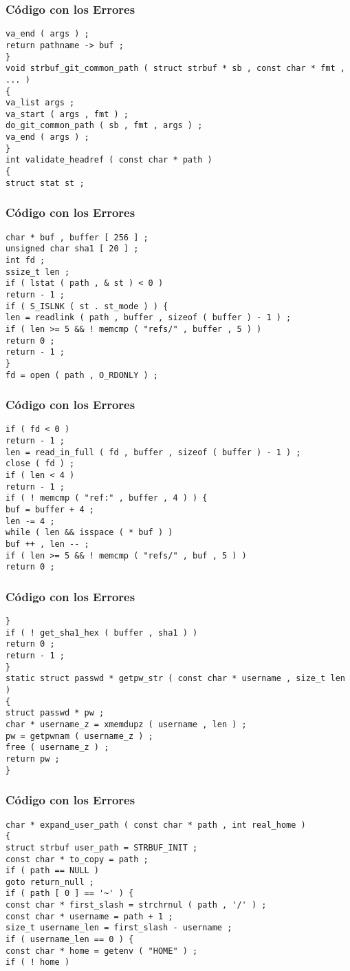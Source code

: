 \documentclass{beamer}
\begin{document}
\begin{frame}[fragile]
\frametitle{C\'odigo con los Errores}
\begin{verbatim}
va_end ( args ) ; 
return pathname -> buf ; 
} 
void strbuf_git_common_path ( struct strbuf * sb , const char * fmt , ... ) 
{ 
va_list args ; 
va_start ( args , fmt ) ; 
do_git_common_path ( sb , fmt , args ) ; 
va_end ( args ) ; 
} 
int validate_headref ( const char * path ) 
{ 
struct stat st ; 
\end{verbatim}
\end{frame}
\begin{frame}[fragile]
\frametitle{C\'odigo con los Errores}
\begin{verbatim}
char * buf , buffer [ 256 ] ; 
unsigned char sha1 [ 20 ] ; 
int fd ; 
ssize_t len ; 
if ( lstat ( path , & st ) < 0 ) 
return - 1 ; 
if ( S_ISLNK ( st . st_mode ) ) { 
len = readlink ( path , buffer , sizeof ( buffer ) - 1 ) ; 
if ( len >= 5 && ! memcmp ( "refs/" , buffer , 5 ) ) 
return 0 ; 
return - 1 ; 
} 
fd = open ( path , O_RDONLY ) ; 
\end{verbatim}
\end{frame}
\begin{frame}[fragile]
\frametitle{C\'odigo con los Errores}
\begin{verbatim}
if ( fd < 0 ) 
return - 1 ; 
len = read_in_full ( fd , buffer , sizeof ( buffer ) - 1 ) ; 
close ( fd ) ; 
if ( len < 4 ) 
return - 1 ; 
if ( ! memcmp ( "ref:" , buffer , 4 ) ) { 
buf = buffer + 4 ; 
len -= 4 ; 
while ( len && isspace ( * buf ) ) 
buf ++ , len -- ; 
if ( len >= 5 && ! memcmp ( "refs/" , buf , 5 ) ) 
return 0 ; 
\end{verbatim}
\end{frame}
\begin{frame}[fragile]
\frametitle{C\'odigo con los Errores}
\begin{verbatim}
} 
if ( ! get_sha1_hex ( buffer , sha1 ) ) 
return 0 ; 
return - 1 ; 
} 
static struct passwd * getpw_str ( const char * username , size_t len ) 
{ 
struct passwd * pw ; 
char * username_z = xmemdupz ( username , len ) ; 
pw = getpwnam ( username_z ) ; 
free ( username_z ) ; 
return pw ; 
} 
\end{verbatim}
\end{frame}
\begin{frame}[fragile]
\frametitle{C\'odigo con los Errores}
\begin{verbatim}
char * expand_user_path ( const char * path , int real_home ) 
{ 
struct strbuf user_path = STRBUF_INIT ; 
const char * to_copy = path ; 
if ( path == NULL ) 
goto return_null ; 
if ( path [ 0 ] == '~' ) { 
const char * first_slash = strchrnul ( path , '/' ) ; 
const char * username = path + 1 ; 
size_t username_len = first_slash - username ; 
if ( username_len == 0 ) { 
const char * home = getenv ( "HOME" ) ; 
if ( ! home ) 
\end{verbatim}
\end{frame}
\end{document}

